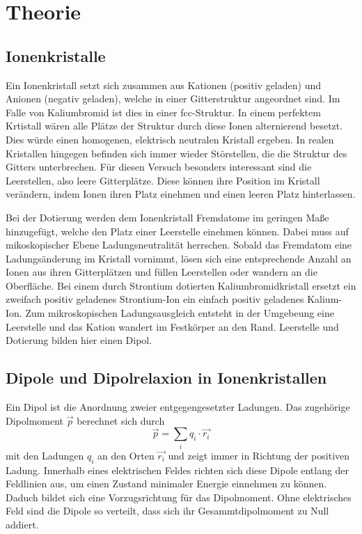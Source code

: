 \section{Theorie}
\label{sec:Theorie}



\subsection{Ionenkristalle}
Ein Ionenkristall setzt sich zusammen aus Kationen (positiv geladen) und Anionen (negativ geladen),
welche in einer Gitterstruktur angeordnet sind. Im Falle von Kaliumbromid ist dies in einer fcc-Struktur.
In einem perfektem Krtistall wären alle Plätze der Struktur durch diese Ionen alternierend besetzt.
Dies würde einen homogenen, elektrisch neutralen Kristall ergeben.
In realen Kristallen hingegen befinden sich immer wieder Störstellen,
die die Struktur des Gitters unterbrechen.
Für diesen Versuch besonders interessant sind die Leerstellen,
also leere Gitterplätze.
Diese können ihre Position im Kristall verändern,
indem Ionen ihren Platz einehmen und einen leeren Platz hinterlassen.

Bei der Dotierung werden dem Ionenkristall Fremdatome im geringen Maße hinzugefügt,
welche den Platz einer Leerstelle einehmen können.
Dabei muss auf mikoskopischer Ebene Ladungsneutralität herrschen.
Sobald das Fremdatom eine Ladungsänderung im Kristall vornimmt,
lösen sich eine entsprechende Anzahl an Ionen aus ihren Gitterplätzen und füllen Leerstellen
oder wandern an die Oberfläche.
Bei einem durch Strontium dotierten Kaliumbromidkristall
ersetzt ein zweifach positiv geladenes Strontium-Ion ein einfach positiv geladenes Kalium-Ion.
Zum mikroskopischen Ladungsausgleich entsteht in der Umgebeung eine Leerstelle 
und das Kation wandert im Festkörper an den Rand.
Leerstelle und Dotierung bilden hier einen Dipol.



\subsection{Dipole und Dipolrelaxion in Ionenkristallen}
Ein Dipol ist die Anordnung zweier entgegengesetzter Ladungen.
Das zugehörige Dipolmoment $\vec{p}$ berechnet sich durch
\begin{equation*}
    \vec{p} = \sum_i q_i \cdot \vec{r_i}
\end{equation*}
mit den Ladungen $q_i$ an den Orten $\vec{r_i}$ 
und zeigt immer in Richtung der positiven Ladung.
Innerhalb eines elektrischen Feldes richten sich diese Dipole entlang der Feldlinien aus,
um einen Zustand minimaler Energie einnehmen zu können.
Daduch bildet sich eine Vorzugsrichtung für das Dipolmoment.
Ohne elektrisches Feld sind die Dipole so verteilt, 
dass sich ihr Gesammtdipolmoment zu Null addiert.

